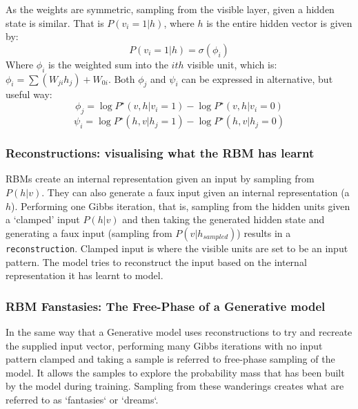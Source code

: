     As the weights are symmetric, sampling from the visible layer, given a hidden state is similar. That is $P(v_i = 1 | h)$, where $h$ is the entire hidden vector is given by:
    \begin{equation}\label{eq:Vis-Gibbs-Update}
     P(v_i = 1 | h) = \sigma(\phi_{i})
    \end{equation}
    Where $\phi_i$ is the weighted sum into the $ith$ visible unit, which is: $ \phi_i = \sum(W_{ji}h_{j}) + W_{0i} $. Both $\phi_j$ and $\psi_i$ can be expressed in alternative, but useful way:
    \begin{equation}
    \phi_j = \log P^\star(v,h | v_i = 1) - \log P^\star(v,h | v_i = 0)
    \end{equation}
    \begin{equation}\label{psi-gibbs-update-rbm}
    \psi_i = \log P^\star(h,v | h_j = 1) - \log P^\star(h,v | h_j = 0)
    \end{equation}



\subsubsection{Reconstructions: visualising what the RBM has learnt}\label{SS:RBM-Reconstructions}

RBMs create an internal representation given an input by sampling from $P(h|v)$. They can also generate a faux input given an internal representation (a $h$). Performing one Gibbs iteration, that is, sampling from the hidden units given a `clamped' input $ P(h|v) $ and then taking the generated hidden state and generating a faux input (sampling from $P(v|h_{sampled})$) results in a \texttt{reconstruction}. Clamped input is where the visible units are set to be an input pattern. The model tries to reconstruct the input based on the internal representation it has learnt to model.

\subsubsection{RBM Fanstasies: The Free-Phase of a Generative model}

In the same way that a Generative model uses reconstructions to try and recreate the supplied input vector, performing many Gibbs iterations with no input pattern clamped and taking a sample is referred to free-phase sampling of the model. It allows the samples to explore the probability mass that has been built by the model during training. Sampling from these wanderings creates what are referred to as `fantasies` or `dreams`.
